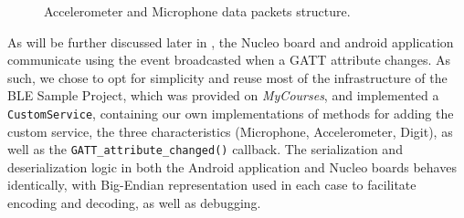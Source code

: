 \begin{figure}[h]

\caption{\label{fig:serialized_samples}Accelerometer and Microphone data packets structure.}
\end{figure} 


As will be further discussed later in , the Nucleo board and android application communicate using the event broadcasted when a GATT attribute changes. As such, we chose to opt for simplicity and reuse most of the infrastructure of the BLE Sample Project, which was provided on \textit{MyCourses}, and implemented a \texttt{CustomService}, containing our own implementations of methods for adding the custom service, the three characteristics (Microphone, Accelerometer, Digit), as well as the \verb|GATT_attribute_changed()| callback. The serialization and deserialization logic in both the Android application and Nucleo boards behaves identically, with Big-Endian representation used in each case to facilitate encoding and decoding, as well as debugging.


